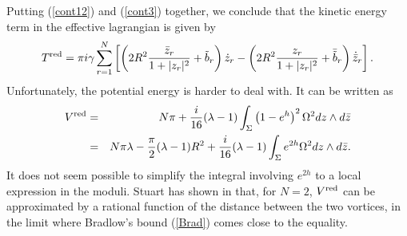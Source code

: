 \documentclass[a4paper,11pt]{article}
\newcommand{\D}{\displaystyle}
\begin{document}
Putting (\ref{cont12}) and (\ref{cont3}) together, we conclude that the
kinetic energy term in the effective lagrangian is given by
\begin{equation}\label{redT}
T^{\rm red}=\pi i \gamma \sum_{r=1}^{N} \left[
\left( 2 R^{2}\frac{\bar{z}_{r}}{1+|z_{r}|^{2}}+\tilde{b}_{r}\right)\dot{z}_{r}
-\left(
2 R^{2}\frac{{z}_{r}}{1+|z_{r}|^{2}}+\bar{\tilde{b}}_{r}\right)
\dot{\bar{z}}_{r}
\right].
\end{equation}
Unfortunately, the potential energy is harder to deal with. It can be
written as
\begin{eqnarray*}
\D V^{\rm red}&=& N \pi+ 
\frac{i}{16}(\lambda-1)\int_{\Sigma}
\left( 1-e^{h} \right) ^{2}\Omega^{2}dz\wedge d\bar{z} \\
&=& N \pi \lambda - \frac{\pi}{2}(\lambda-1) R^{2}  + 
\frac{i}{16}(\lambda-1)\int_{\Sigma}e^{2h}\Omega^{2} dz\wedge d\bar{z}.
\end{eqnarray*}
It does not seem possible to simplify the integral involving 
$e^{2h}$ to a local expression in the moduli. Stuart has shown in 
\cite{Sturr} that, for $N=2$, $V^{\rm red}$ can be approximated by a rational
function of the distance between the two vortices, in the limit where 
Bradlow's bound (\ref{Brad}) comes close to the equality.
\end{document}
